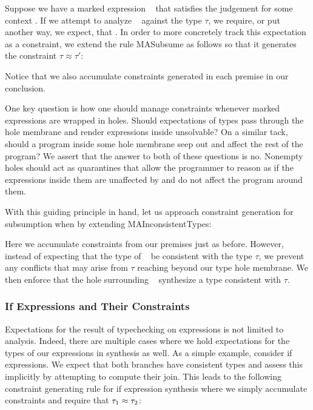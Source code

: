 Suppose we have a marked expression \ECMV~ that satisfies the judgement  for some context \ctx. If we attempt to analyze \ECMV~ against the type $\tau$, we require, or put another way, we expect, that . In order to more concretely track this expectation as a constraint, we extend the rule MASubsume as follows so that it generates the constraint $\tau \approx \tau'$:
\begin{mathpar}
\end{mathpar}
Notice that we also accumulate constraints generated in each premise in our conclusion.

One key question is how one should manage constraints whenever marked expressions are wrapped in holes. Should expectations of types pass through the hole membrane and render expressions inside unsolvable? On a similar tack, should a program inside some hole membrane seep out and affect the rest of the program? We assert that the answer to both of these questions is no. Nonempty holes should act as quarantines that allow the programmer to reason as if the expressions inside them are unaffected by and do not affect the program around them.

With this guiding principle in hand, let us approach constraint generation for subsumption when  by extending MAInconsistentTypes:
\begin{mathpar}
\end{mathpar}
Here we accumulate constraints from our premises just as before. However, instead of expecting that the type of \ECMV~ be consistent with the type $\tau$, we prevent any conflicts that may arise from $\tau$ reaching beyond our type hole membrane. We then enforce that the hole surrounding \ECMV~ synthesize a type consistent with $\tau$.

\subsubsection{If Expressions and Their Constraints}
Expectations for the result of typechecking on expressions is not limited to analysis. Indeed, there are multiple cases where we hold expectations for the types of our expressions in synthesis as well. As a simple example, consider if expressions. We expect that both branches have consistent types and assess this implicitly by attempting to compute their join. This leads to the following constraint generating rule for if expression synthesis where we simply accumulate constraints and require that $\TMV_1 \approx \TMV_2$:

